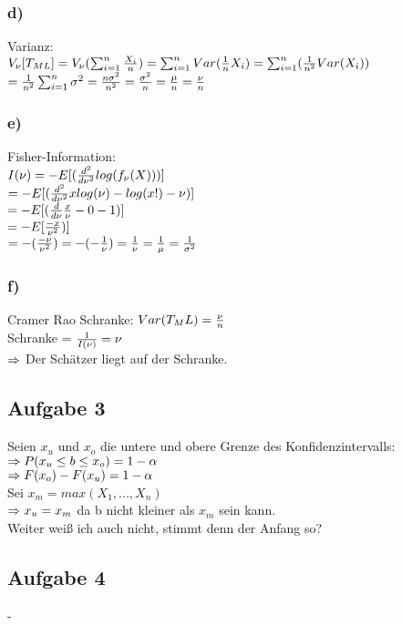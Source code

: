\documentclass[11pt]{amsart}
\begin{document}
\subsubsection*{d)}
Varianz: \\
$V_{\nu}[T_{ML}] = V_{\nu}(\sum_{i=1}^n \frac{X_i}{n}) = \sum_{i=1}^nVar(\frac{1}{n}X_i) = \sum_{i=1}^n(\frac{1}{n^2}Var(X_i))$ \\
$= \frac{1}{n^2}\sum_{i=1}^n\sigma^2 = \frac{n\sigma^2}{n^2} = \frac{\sigma^2}{n} = \frac{\mu}{n} = \frac{\nu}{n}$ \\
\subsubsection*{e)}
Fisher-Information: \\
$I(\nu) = -E[(\frac{d^2}{d\nu^2}log(f_{\nu}(X)))]$ \\
$= -E[(\frac{d^2}{d\nu^2} xlog(\nu)-log(x!)-\nu)]$ \\
$= -E[(\frac{d}{d\nu} \frac{x}{\nu} - 0 - 1)]$ \\
$= -E[\frac{-x}{\nu^2})]$ \\
$= -(\frac{-\nu}{\nu^2}) = -(-\frac{1}{\nu}) = \frac{1}{\nu} = \frac{1}{\mu} = \frac{1}{\sigma^2}$ \\
\subsubsection*{f)}
Cramer Rao Schranke:
$Var(T_ML) = \frac{\nu}{n}$ \\
Schranke = $\frac{1}{I(\nu)} = \nu$ \\
$\Rightarrow$ Der Schätzer liegt auf der Schranke.

\subsection*{Aufgabe 3}
Seien $x_u$ und $x_o$ die untere und obere Grenze des Konfidenzintervalls: \\
$\Rightarrow P(x_u \leq b \leq x_o) = 1 - \alpha$ \\
$\Rightarrow F(x_o) - F(x_u) = 1 - \alpha$ \\
Sei $x_m = max(X_1,...,X_n)$ \\
$\Rightarrow x_u = x_m$ da b nicht kleiner als $x_m$ sein kann. \\
Weiter weiß ich auch nicht, stimmt denn der Anfang so?

\subsection*{Aufgabe 4}
-
\end{document}
